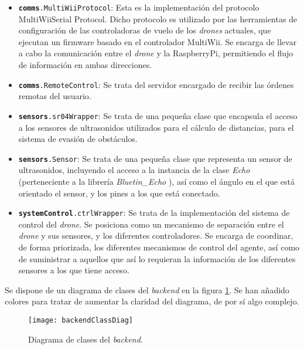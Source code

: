 \begin{itemize}
\item \texttt{\textbf{comms}.MultiWiiProtocol}: Esta es la implementación del protocolo MultiWiiSerial Protocol. Dicho protocolo es utilizado por las herramientas de configuración de las controladoras de vuelo de los \emph{drones} actuales, que ejecutan un firmware basado en el controlador MultiWii. Se encarga de llevar a cabo la comunicación entre el \emph{drone} y la RaspberryPi, permitiendo el flujo de información en ambas direcciones. 
\item \texttt{\textbf{comms}.RemoteControl}: Se trata del servidor encargado de recibir las órdenes remotas del usuario.
\item \texttt{\textbf{sensors}.sr04Wrapper}: Se trata de una pequeña clase que encapsula el acceso a los sensores de ultrasonidos utilizados para el cálculo de distancias, para el sistema de evasión de obstáculos.
\item \texttt{\textbf{sensors}.Sensor}: Se trata de una pequeña clase que representa un sensor de ultrasonidos, incluyendo el acceso a la instancia de la clase \emph{Echo} (perteneciente a la librería \emph{Bluetin\_Echo} ), así como el ángulo en el que está orientado el sensor, y los pines a los que está conectado.
\item \texttt{\textbf{systemControl}.ctrlWrapper}: Se trata de la implementación del sistema de control del \emph{drone}. Se posiciona como un mecanismo de separación entre el \emph{drone} y sus sensores, y los diferentes controladores. Se encarga de coordinar, de forma priorizada, los diferentes mecanismos de control del agente, así como de suministrar a aquellos que así lo requieran la información de los diferentes sensores a los que tiene acceso.
\end{itemize}

Se dispone de un diagrama de clases del \emph{backend} en la figura \ref{fig:backendClassDiag}. Se han añadido colores para tratar de aumentar la claridad del diagrama, de por sí algo complejo.
\newpage

\begin{figure}[H]
	\centering
	\texttt{[image: backendClassDiag]}
	\caption[Diagrama de clases BackEnd]{Diagrama de clases del \emph{backend}.}\label{fig:backendClassDiag}
\end{figure}

